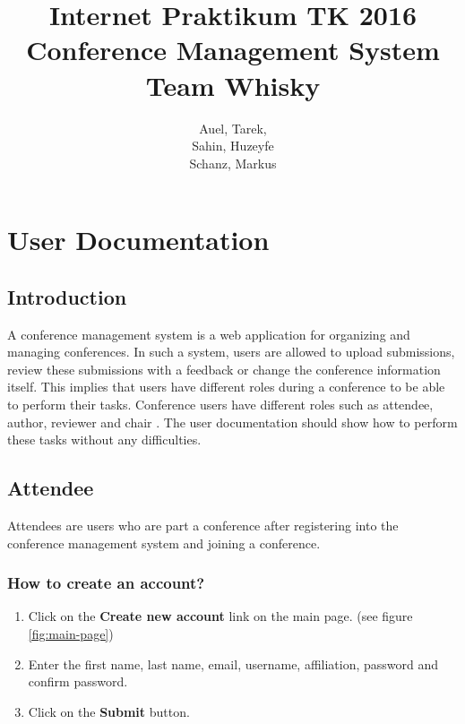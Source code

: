 \documentclass[nochapterpage,nopartpage,noheadingspace,numbersubsubsec,bigchapter,colorback,accentcolor=tud9c,10pt]{tudreport}
\title{Internet Praktikum TK 2016\\ Conference Management System\\ Team Whisky}
\subtitle{Auel, Tarek,\\ Sahin, Huzeyfe\\ Schanz, Markus}
\begin{document}
\maketitle
\tableofcontents


\part{User Documentation}
\label{part:user}

  \chapter{Introduction}
  \label{ch:user:intro}

A conference management system is a web application for organizing and managing conferences. In such a system, users are allowed to upload submissions, review these submissions with a feedback or change the conference information itself. This implies that users have different roles during a conference to be able to perform their tasks. Conference users have different roles such as attendee, author, reviewer and chair . The user documentation should show how to perform these tasks without any difficulties.


  \chapter{Attendee}

Attendees are users who are part a conference after registering into the conference management system and joining a conference.

	\section{How to create an account?}


\begin{enumerate}
	\item	Click on the \textbf{Create new account} link on the main page. (see figure \ref{fig:main-page})
	\item	Enter the first name, last name, email, username, affiliation, password and confirm password.
	\item	Click on the \textbf{Submit} button.
\end{enumerate}
\end{document}
